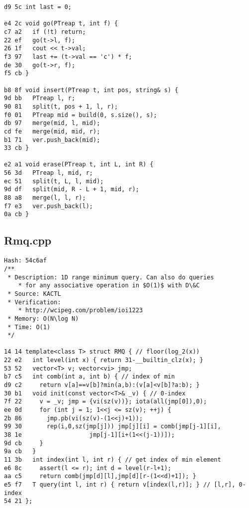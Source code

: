 \documentclass[11pt, a4paper, twoside]{article}
\begin{document}
\begin{lstlisting}
d9 5c int last = 0;
 
e4 2c void go(PTreap t, int f) {
c7 a2   if (!t) return;
22 ef   go(t->l, f);
26 1f   cout << t->val;
f3 97   last += (t->val == 'c') * f;
de 30   go(t->r, f);
f5 cb }
 
b8 8f void insert(PTreap t, int pos, string& s) {
9d bb   PTreap l, r;
90 81   split(t, pos + 1, l, r);
f0 01   PTreap mid = build(0, s.size(), s);
db 97   merge(mid, l, mid);
cd fe   merge(mid, mid, r);
b1 71   ver.push_back(mid);
33 cb }
 
e2 a1 void erase(PTreap t, int L, int R) {
56 3d   PTreap l, mid, r;
ec 51   split(t, L, l, mid);
9d df   split(mid, R - L + 1, mid, r);
88 a8   merge(l, l, r);
f7 e3   ver.push_back(l);
0a cb }
\end{lstlisting}

\subsection{Rmq.cpp}
\begin{lstlisting}
Hash: 54c6af
/**
 * Description: 1D range minimum query. Can also do queries 
 	* for any associative operation in $O(1)$ with D\&C
 * Source: KACTL
 * Verification: 
	* http://wcipeg.com/problem/ioi1223
 * Memory: O(N\log N)
 * Time: O(1)
 */
 
14 14 template<class T> struct RMQ { // floor(log_2(x))
22 e2   int level(int x) { return 31-__builtin_clz(x); } 
53 52   vector<T> v; vector<vi> jmp;
b7 c5   int comb(int a, int b) { // index of min
d9 c2     return v[a]==v[b]?min(a,b):(v[a]<v[b]?a:b); } 
30 b1   void init(const vector<T>& _v) { // 0-index
7f 22     v = _v; jmp = {vi(sz(v))}; iota(all(jmp[0]),0);
ee 0d     for (int j = 1; 1<<j <= sz(v); ++j) {
2b 86       jmp.pb(vi(sz(v)-(1<<j)+1));
99 30       rep(i,0,sz(jmp[j])) jmp[j][i] = comb(jmp[j-1][i],
38 1e                   jmp[j-1][i+(1<<(j-1))]);
9d cb     }
9a cb   }
11 3b   int index(int l, int r) { // get index of min element
e6 8c     assert(l <= r); int d = level(r-l+1);
aa c5     return comb(jmp[d][l],jmp[d][r-(1<<d)+1]); }
e5 f7   T query(int l, int r) { return v[index(l,r)]; } // [l,r], 0-index
54 21 };
\end{lstlisting}
\end{document}
